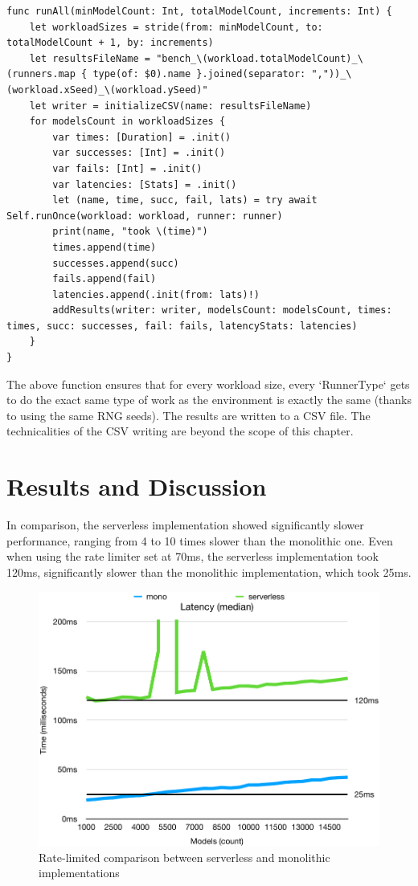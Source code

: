 \begin{verbatim}
func runAll(minModelCount: Int, totalModelCount, increments: Int) {
    let workloadSizes = stride(from: minModelCount, to: totalModelCount + 1, by: increments)
    let resultsFileName = "bench_\(workload.totalModelCount)_\(runners.map { type(of: $0).name }.joined(separator: ","))_\(workload.xSeed)_\(workload.ySeed)"
    let writer = initializeCSV(name: resultsFileName)
    for modelsCount in workloadSizes {
        var times: [Duration] = .init()
        var successes: [Int] = .init()
        var fails: [Int] = .init()
        var latencies: [Stats] = .init()
        let (name, time, succ, fail, lats) = try await Self.runOnce(workload: workload, runner: runner)
        print(name, "took \(time)")
        times.append(time)
        successes.append(succ)
        fails.append(fail)
        latencies.append(.init(from: lats)!)
        addResults(writer: writer, modelsCount: modelsCount, times: times, succ: successes, fail: fails, latencyStats: latencies)
    }
}
\end{verbatim}

The above function ensures that for every workload size, every `RunnerType` gets to do the exact same type of work as the environment is exactly the same (thanks to using the same RNG seeds). The results are written to a CSV file. The technicalities of the CSV writing are beyond the scope of this chapter.


\section{Results and Discussion}

In comparison, the serverless implementation showed significantly slower performance, ranging from 4 to 10 times slower than the monolithic one. Even when using the rate limiter set at 70ms, the serverless implementation took 120ms, significantly slower than the monolithic implementation, which took 25ms.

\begin{figure}[h!]
    \centering
    \includegraphics[width=\textwidth]{rate_l70ms_latency_med.pdf}
    \caption{Rate-limited comparison between serverless and monolithic implementations}
    \label{fig:rate_limited_comparison}
\end{figure}

